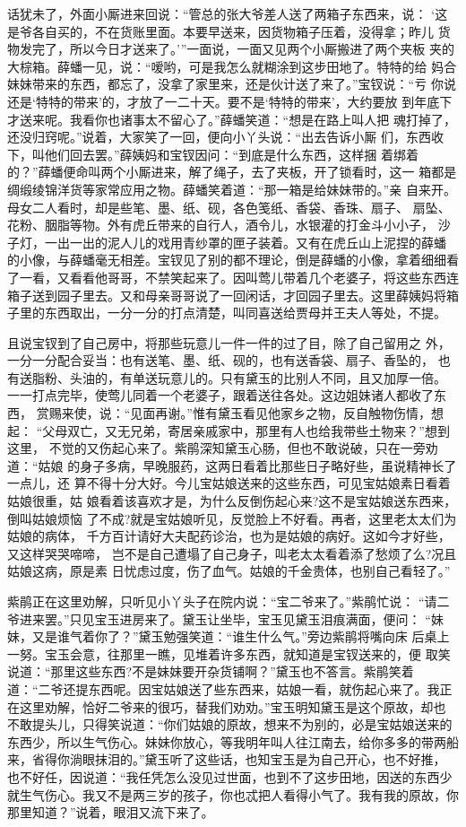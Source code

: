 话犹未了，外面小厮进来回说：“管总的张大爷差人送了两箱子东西来，说：
‘这是爷各自买的，不在货账里面。本要早送来，因货物箱子压着，没得拿；昨儿
货物发完了，所以今日才送来了。’”一面说，一面又见两个小厮搬进了两个夹板
夹的大棕箱。薛蟠一见，说：“嗳哟，可是我怎么就糊涂到这步田地了。特特的给
妈合妹妹带来的东西，都忘了，没拿了家里来，还是伙计送了来了。”宝钗说：“亏
你说还是‘特特的带来’的，才放了一二十天。要不是‘特特的带来’，大约要放
到年底下才送来呢。我看你也诸事太不留心了。”薛蟠笑道：“想是在路上叫人把
魂打掉了，还没归窍呢。”说着，大家笑了一回，便向小丫头说：“出去告诉小厮
们，东西收下，叫他们回去罢。”薛姨妈和宝钗因问：“到底是什么东西，这样捆
着绑着的？”薛蟠便命叫两个小厮进来，解了绳子，去了夹板，开了锁看时，这一
箱都是绸缎绫锦洋货等家常应用之物。薛蟠笑着道：“那一箱是给妹妹带的。”亲
自来开。母女二人看时，却是些笔、墨、纸、砚，各色笺纸、香袋、香珠、扇子、
扇坠、花粉、胭脂等物。外有虎丘带来的自行人，酒令儿，水银灌的打金斗小小子，
沙子灯，一出一出的泥人儿的戏用青纱罩的匣子装着。又有在虎丘山上泥捏的薛蟠
的小像，与薛蟠毫无相差。宝钗见了别的都不理论，倒是薛蟠的小像，拿着细细看
了一看，又看看他哥哥，不禁笑起来了。因叫莺儿带着几个老婆子，将这些东西连
箱子送到园子里去。又和母亲哥哥说了一回闲话，才回园子里去。这里薛姨妈将箱
子里的东西取出，一分一分的打点清楚，叫同喜送给贾母并王夫人等处，不提。

且说宝钗到了自己房中，将那些玩意儿一件一件的过了目，除了自己留用之
外，一分一分配合妥当：也有送笔、墨、纸、砚的，也有送香袋、扇子、香坠的，
也有送脂粉、头油的，有单送玩意儿的。只有黛玉的比别人不同，且又加厚一倍。
一一打点完毕，使莺儿同着一个老婆子，跟着送往各处。这边姐妹诸人都收了东西，
赏赐来使，说：“见面再谢。”惟有黛玉看见他家乡之物，反自触物伤情，想起：
“父母双亡，又无兄弟，寄居亲戚家中，那里有人也给我带些土物来？”想到这里，
不觉的又伤起心来了。紫鹃深知黛玉心肠，但也不敢说破，只在一旁劝道：“姑娘
的身子多病，早晚服药，这两日看着比那些日子略好些，虽说精神长了一点儿，还
算不得十分大好。今儿宝姑娘送来的这些东西，可见宝姑娘素日看着姑娘很重，姑
娘看着该喜欢才是，为什么反倒伤起心来?这不是宝姑娘送东西来，倒叫姑娘烦恼
了不成?就是宝姑娘听见，反觉脸上不好看。再者，这里老太太们为姑娘的病体，
千方百计请好大夫配药诊治，也为是姑娘的病好。这如今才好些，又这样哭哭啼啼，
岂不是自己遭塌了自己身子，叫老太太看着添了愁烦了么?况且姑娘这病，原是素
日忧虑过度，伤了血气。姑娘的千金贵体，也别自己看轻了。”

紫鹃正在这里劝解，只听见小丫头子在院内说：“宝二爷来了。”紫鹃忙说：
“请二爷进来罢。”只见宝玉进房来了。黛玉让坐毕，宝玉见黛玉泪痕满面，便问：
“妹妹，又是谁气着你了？”黛玉勉强笑道：“谁生什么气。”旁边紫鹃将嘴向床
后桌上一努。宝玉会意，往那里一瞧，见堆着许多东西，就知道是宝钗送来的，便
取笑说道：“那里这些东西?不是妹妹要开杂货铺啊？”黛玉也不答言。紫鹃笑着
道：“二爷还提东西呢。因宝姑娘送了些东西来，姑娘一看，就伤起心来了。我正
在这里劝解，恰好二爷来的很巧，替我们劝劝。”宝玉明知黛玉是这个原故，却也
不敢提头儿，只得笑说道：“你们姑娘的原故，想来不为别的，必是宝姑娘送来的
东西少，所以生气伤心。妹妹你放心，等我明年叫人往江南去，给你多多的带两船
来，省得你淌眼抹泪的。”黛玉听了这些话，也知宝玉是为自己开心，也不好推，
也不好任，因说道：“我任凭怎么没见过世面，也到不了这步田地，因送的东西少
就生气伤心。我又不是两三岁的孩子，你也忒把人看得小气了。我有我的原故，你
那里知道？”说着，眼泪又流下来了。

